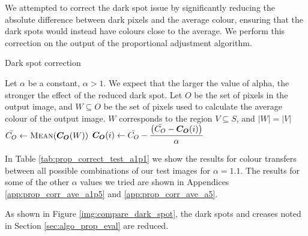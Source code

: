We attempted to correct the dark spot issue by significantly reducing the absolute difference between dark pixels and the average colour, ensuring that the dark spots would instead have colours close to the average. We perform this correction on the output of the proportional adjustment algorithm.

\begin{algorithm}[H]
\caption{Dark spot correction}
\label{eq:prop_corr_algo}
\begin{algorithmic}
\State Let $\alpha$ be a constant, $\alpha  > 1$. We expect that the larger the value of alpha, the stronger the effect of the reduced dark spot.
\State Let $O$ be the set of pixels in the output image, and $W \subseteq O$ be the set of pixels used to calculate the average colour of the output image. $W$ corresponds to the region $V \subseteq S$, and $\left|W\right| = \left|V\right|$  
\State $\mean{C_O} \gets \Call{Mean}{\vect{C_O}(W)}$
\State $\boldsymbol{C_O}(i) \gets \displaystyle \bar{C_O} - \frac{\left(\bar{C_O} - \boldsymbol{C_O}(i)\right)}{\alpha}$
\EndIf
\EndFor
\end{algorithmic}
\end{algorithm}


In Table \ref{tab:prop_correct_test_a1p1} we show the results for colour transfers between all possible combinations of our test images for $\alpha = 1.1$. The results for some of the other $\alpha$ values we tried are shown in Appendices \ref{app:prop_corr_ave_a1p5} and \ref{app:prop_corr_ave_a5}.



As shown in Figure \ref{img:compare_dark_spot}, the dark spots and creases noted in Section \ref{sec:algo_prop_eval} are reduced.

